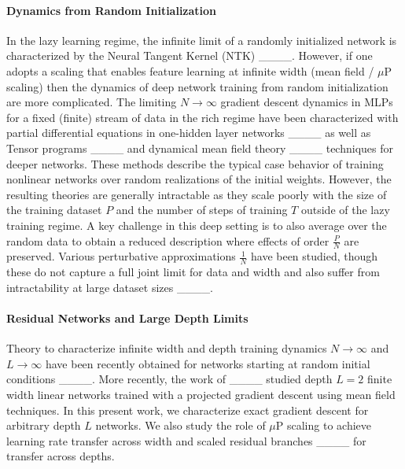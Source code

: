 \paragraph{Dynamics from Random Initialization} In the lazy learning regime, the infinite limit of a randomly initialized network is characterized by the Neural Tangent Kernel (NTK) ____. However, if one adopts a scaling that enables feature learning at infinite width (mean field / $\mu$P scaling) then the dynamics of deep network training from random initialization are more complicated. The limiting $N \to \infty$ gradient descent dynamics in MLPs for a fixed (finite) stream of data in the rich regime have been characterized with partial differential equations in one-hidden layer networks ____  as well as Tensor programs ____ and dynamical mean field theory ____ techniques for deeper networks. These methods describe the typical case behavior of training nonlinear networks over random realizations of the initial weights. However, the resulting theories are generally intractable as they scale poorly with the size of the training dataset $P$ and the number of steps of training $T$ outside of the lazy training regime. A key challenge in this deep setting is to also average over the random data to obtain a reduced description where effects of order $\frac{ P }{ N }$ are preserved. Various perturbative approximations $\frac{1}{N}$ have been studied, though these do not capture a full joint limit for data and width and also suffer from intractability at large dataset sizes ____.

\vspace{-8pt}
\paragraph{Residual Networks and Large Depth Limits} Theory to characterize infinite width and depth training dynamics $N \to \infty$ and $L \to \infty$ have been recently obtained for networks starting at random initial conditions ____.  More recently, the work of 
____ studied depth $L = 2$ finite width linear networks trained with a projected gradient descent using mean field techniques. In this present work, we characterize exact gradient descent for arbitrary depth $L$ networks. We also study the role of $\mu$P scaling to achieve learning rate transfer across width and scaled residual branches ____ for transfer across depths. 

\vspace{-8pt}
